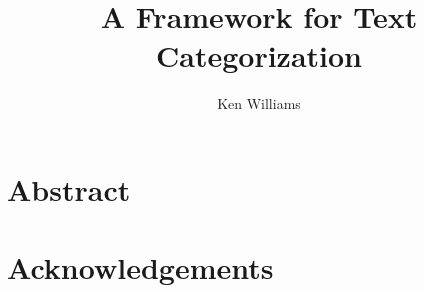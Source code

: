 \documentclass[a4paper]{report}
\title{A Framework for Text Categorization}
\author{Ken Williams}
\begin{document}
\newcommand{\method}[1]{\texttt{#1()}}
\newcommand{\class}[1]{\texttt{#1}}
\newcommand{\aicat}{\texttt{AI::Cat\-e\-gor\-i\-zer}}

\maketitle

\chapter*{Abstract}
\chapter*{Acknowledgements}

\tableofcontents











\end{document}

